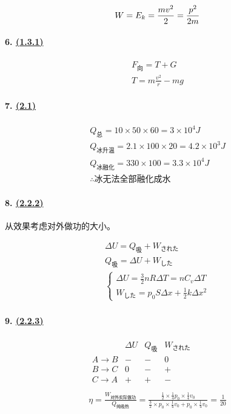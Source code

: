 \begin{equation*}
        W=E_k=\frac{mv^2}{2}=\frac{p^2}{2m}\\
\end{equation*}

\paragraph{6. \hyperref[subsec:1.3.1]{(1.3.1)}}

\begin{gather*}
    F_\textrm{向}=T+G\\
    T=m\frac{v^2}{r}-mg
\end{gather*}

\paragraph{7. \hyperref[sec:2.1]{(2.1)}}

\begin{gather*}
    Q_\textrm{总}=10\times50\times60=3\times10^4J\\
    Q_\textrm{冰升温}=2.1\times100\times20=4.2\times10^3J\\
    Q_\textrm{冰融化}=330\times100=3.3\times10^4J\\
    \therefore\textrm{冰无法全部融化成水}
\end{gather*}

\paragraph{8. \hyperref[subsec:2.2.2]{(2.2.2)}} 从效果考虑对外做功的大小。

\begin{gather*}
    \Delta U=Q_\textrm{吸}+W_\textrm{された}\\
    Q_\textrm{吸}=\Delta U+W_\textrm{した}\\
    \begin{cases}
        \Delta U=\frac32nR\Delta T=nC_v\Delta T\\
        W_\textrm{した}=p_0S\Delta x+\frac12k\Delta x^2
    \end{cases}
\end{gather*}

\paragraph{9. \hyperref[subsec:2.2.3]{(2.2.3)}}

\begin{gather*}
    \begin{array}{c|ccc}
        & \Delta U & Q_\textrm{吸} & W_\textrm{された} \\\hline
        A\to B & - & - & 0 \\
        B\to C & 0 & - & + \\
        C\to A & + & + & - \\
    \end{array}\\
    \eta=\frac{W_\textrm{对外实际做功}}{Q_\textrm{纯吸热}}
    =\frac{\frac12\times\frac14p_0\times\frac14v_0}{\frac32\times p_0\times\frac14v_0+p_0\times\frac14v_0}=\frac{1}{20}
\end{gather*}

